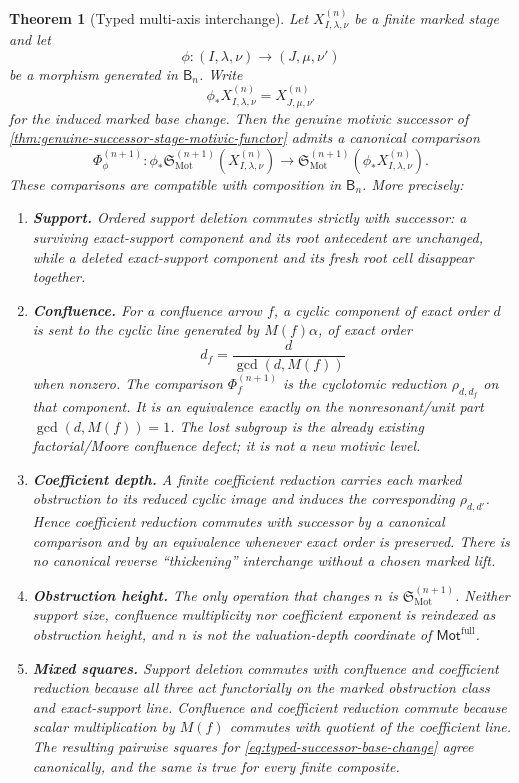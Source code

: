 \documentclass[11pt]{article}
\newtheorem{theorem}{Theorem}[section]
\theoremstyle{remark}
\newcommand{\Mot}{\mathrm{Mot}}
\providecommand{\FullMot}{\mathsf{Mot}^{\mathrm{full}}}
\begin{document}
\begin{theorem}[Typed multi-axis interchange]
\label{thm:typed-multi-axis-interchange}
Let $X^{(n)}_{I,\lambda,\nu}$ be a finite marked stage and let
\[
 \phi:(I,\lambda,\nu)\longrightarrow(J,\mu,\nu')
\]
be a morphism generated in $\mathsf B_n$.  Write
\[
 \phi_*X^{(n)}_{I,\lambda,\nu}=X^{(n)}_{J,\mu,\nu'}
\]
for the induced marked base change.  Then the genuine motivic successor of
\cref{thm:genuine-successor-stage-motivic-functor} admits a canonical comparison
\begin{equation}\label{eq:typed-successor-base-change}
 \boxed{
 \Phi_{\phi}^{(n+1)}:
 \phi_*\mathfrak S_{\Mot}^{(n+1)}(X^{(n)}_{I,\lambda,\nu})
 \longrightarrow
 \mathfrak S_{\Mot}^{(n+1)}(\phi_*X^{(n)}_{I,\lambda,\nu}).}
\end{equation}
These comparisons are compatible with composition in $\mathsf B_n$.  More precisely:
\begin{enumerate}[label=\textup{(\roman*)}]
\item \textbf{Support.}  Ordered support deletion commutes strictly with successor:
      a surviving exact-support component and its root antecedent are unchanged, while a
      deleted exact-support component and its fresh root cell disappear together.
\item \textbf{Confluence.}  For a confluence arrow $f$, a cyclic component of exact
      order $d$ is sent to the cyclic line generated by $M(f)\alpha$, of exact order
      \[
       d_f=\frac{d}{\gcd(d,M(f))}
      \]
      when nonzero.  The comparison $\Phi_f^{(n+1)}$ is the cyclotomic reduction
      $\rho_{d,d_f}$ on that component.  It is an equivalence exactly on the
      nonresonant/unit part $\gcd(d,M(f))=1$.  The lost subgroup is the already existing
      factorial/Moore confluence defect; it is not a new motivic level.
\item \textbf{Coefficient depth.}  A finite coefficient reduction carries each marked
      obstruction to its reduced cyclic image and induces the corresponding
      $\rho_{d,d'}$.  Hence coefficient reduction commutes with successor by a canonical
      comparison and by an equivalence whenever exact order is preserved.  There is no
      canonical reverse ``thickening'' interchange without a chosen marked lift.
\item \textbf{Obstruction height.}  The only operation that changes $n$ is
      $\mathfrak S_{\Mot}^{(n+1)}$.  Neither support size, confluence multiplicity nor
      coefficient exponent is reindexed as obstruction height, and \(n\) is not the
      valuation-depth coordinate of \(\FullMot\).
\item \textbf{Mixed squares.}  Support deletion commutes with confluence and coefficient
      reduction because all three act functorially on the marked obstruction class and
      exact-support line.  Confluence and coefficient reduction commute because scalar
      multiplication by $M(f)$ commutes with quotient of the coefficient line.  The
      resulting pairwise squares for \eqref{eq:typed-successor-base-change} agree
      canonically, and the same is true for every finite composite.
\end{enumerate}
\end{theorem}
\end{document}
